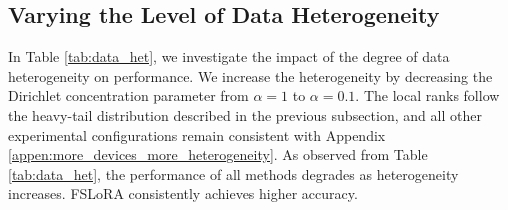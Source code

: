 \documentclass{article} %
\theoremstyle{plain}
\theoremstyle{definition}
\begin{document}
\subsection{Varying the Level of Data Heterogeneity}

In Table \ref{tab:data_het}, we investigate the impact of the degree of data heterogeneity on performance. We increase the heterogeneity by decreasing the Dirichlet concentration parameter from $\alpha = 1$ to $\alpha = 0.1$. 
The local ranks follow the heavy-tail distribution described in the previous subsection, and all other experimental configurations remain consistent with Appendix \ref{appen:more_devices_more_heterogeneity}. 
As observed from Table \ref{tab:data_het}, the performance of all methods degrades as heterogeneity increases. FSLoRA consistently achieves higher accuracy.

\begin{table}[h]
\centering
\caption{Accuracy comparison under different data heterogeneity settings. FSLoRA maintains its advantage over the baselines as the data heterogeneity increases. The number of clients is set to $50$.}
\small
{}
\label{tab:data_het}
\end{table}
\end{document}
